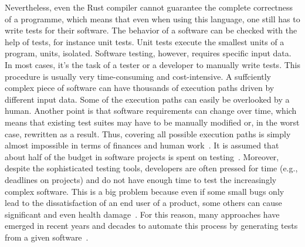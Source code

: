 \documentclass{article}
\begin{document}
Nevertheless, even the Rust compiler cannot guarantee the complete correctness of a programme, which means that even when using this language, one still has to write tests for their software. The behavior of a software can be checked with the help of tests, for instance unit tests. Unit tests execute the smallest units of a program, units, isolated. Software testing, however, requires specific input data. In most cases, it's the task of a tester or a developer to manually write tests. This procedure is usually very time-consuming and cost-intensive. A suffciently complex piece of software can have thousands of execution paths driven by different input data. Some of the execution paths can easily be overlooked by a human. Another point is that software requirements can change over time, which means that existing test suites may have to be manually modified or, in the worst case, rewritten as a result. Thus, covering all possible execution paths is simply almost impossible in terms of finances and human work~\cite{Myers2012}. It is assumed that about half of the budget in software projects is spent on testing~\cite{Beizer2003}. Moreover, despite the sophisticated testing tools, developers are often pressed for time (e.g., deadlines on projects) and do not have enough time to test the increasingly complex software. This is a big problem because even if some small bugs only lead to the dissatisfaction of an end user of a product, some others can cause significant and even health damage~\cite{Myers2012}. For this reason, many approaches have emerged in recent years and decades to automate this process by generating tests from a given software~\cite{McMinn_2004}.
\end{document}
